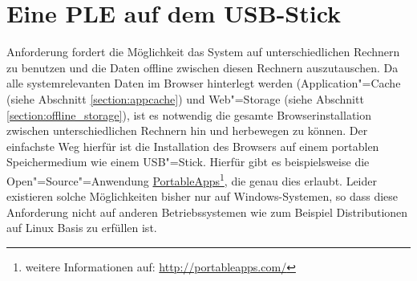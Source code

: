 \section{Eine \ac{PLE} auf dem USB-Stick}\label{section:ple_auf_usb}
Anforderung  fordert die Möglichkeit das System auf unterschiedlichen Rechnern zu benutzen und die Daten offline zwischen diesen Rechnern auszutauschen. Da alle systemrelevanten Daten im Browser hinterlegt werden (Application"=Cache (siehe Abschnitt \ref{section:appcache}) und Web"=Storage (siehe Abschnitt \ref{section:offline_storage}), ist es notwendig die gesamte Browserinstallation zwischen unterschiedlichen Rechnern hin und herbewegen zu können. Der einfachste Weg hierfür ist die Installation des Browsers auf einem portablen Speichermedium wie einem USB"=Stick. Hierfür gibt es beispielsweise die Open"=Source"=Anwendung \href{http://portableapps.com/}{PortableApps}\footnote{weitere Informationen auf: \url{http://portableapps.com/}}, die genau dies erlaubt. Leider existieren solche Möglichkeiten bisher nur auf Windows-Systemen, so dass diese Anforderung nicht auf anderen Betriebssystemen wie zum Beispiel Distributionen auf Linux Basis zu erfüllen ist. 